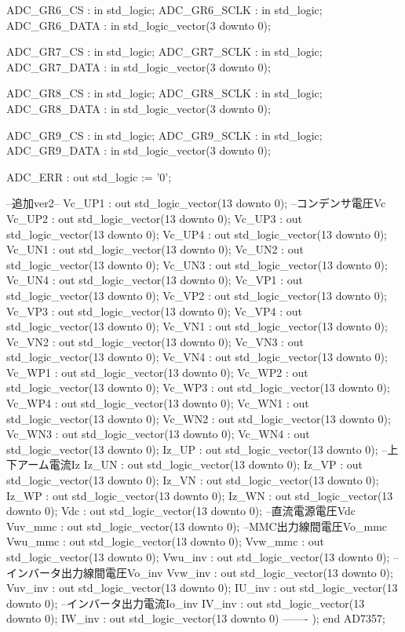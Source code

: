 \begin{mylisting}[language=VHDL,caption=AD変換モジュール,label=appF_ADC_module_VHDL]
		ADC_GR6_CS		: in	std_logic;
		ADC_GR6_SCLK	: in	std_logic;
		ADC_GR6_DATA	: in	std_logic_vector(3 downto 0);

		ADC_GR7_CS		: in	std_logic;
		ADC_GR7_SCLK	: in	std_logic;
		ADC_GR7_DATA	: in	std_logic_vector(3 downto 0);

		ADC_GR8_CS		: in	std_logic;
		ADC_GR8_SCLK	: in	std_logic;
		ADC_GR8_DATA	: in	std_logic_vector(3 downto 0);

		ADC_GR9_CS		: in	std_logic;
		ADC_GR9_SCLK	: in	std_logic;
		ADC_GR9_DATA	: in	std_logic_vector(3 downto 0);
		
		ADC_ERR			: out	std_logic						:= '0';
		
		--追加ver2--
		Vc_UP1		: out	std_logic_vector(13 downto 0);		--コンデンサ電圧Vc
		Vc_UP2		: out	std_logic_vector(13 downto 0);
		Vc_UP3		: out	std_logic_vector(13 downto 0);
		Vc_UP4		: out	std_logic_vector(13 downto 0);
		Vc_UN1		: out	std_logic_vector(13 downto 0);
		Vc_UN2		: out	std_logic_vector(13 downto 0);
		Vc_UN3		: out	std_logic_vector(13 downto 0);
		Vc_UN4		: out	std_logic_vector(13 downto 0);
		Vc_VP1		: out	std_logic_vector(13 downto 0);
		Vc_VP2		: out	std_logic_vector(13 downto 0);
		Vc_VP3		: out	std_logic_vector(13 downto 0);
		Vc_VP4		: out	std_logic_vector(13 downto 0);
		Vc_VN1		: out	std_logic_vector(13 downto 0);
		Vc_VN2		: out	std_logic_vector(13 downto 0);
		Vc_VN3		: out	std_logic_vector(13 downto 0);
		Vc_VN4		: out	std_logic_vector(13 downto 0);
		Vc_WP1		: out	std_logic_vector(13 downto 0);
		Vc_WP2		: out	std_logic_vector(13 downto 0);
		Vc_WP3		: out	std_logic_vector(13 downto 0);
		Vc_WP4		: out	std_logic_vector(13 downto 0);
		Vc_WN1		: out	std_logic_vector(13 downto 0);
		Vc_WN2		: out	std_logic_vector(13 downto 0);
		Vc_WN3		: out	std_logic_vector(13 downto 0);
		Vc_WN4		: out	std_logic_vector(13 downto 0);
		Iz_UP			: out	std_logic_vector(13 downto 0);		--上下アーム電流Iz
		Iz_UN			: out	std_logic_vector(13 downto 0);
		Iz_VP			: out	std_logic_vector(13 downto 0);
		Iz_VN			: out	std_logic_vector(13 downto 0);
		Iz_WP			: out	std_logic_vector(13 downto 0);
		Iz_WN			: out	std_logic_vector(13 downto 0);
		Vdc			: out	std_logic_vector(13 downto 0);			--直流電源電圧Vdc
		Vuv_mmc		: out	std_logic_vector(13 downto 0);		--MMC出力線間電圧Vo_mmc
		Vwu_mmc		: out	std_logic_vector(13 downto 0);
		Vvw_mmc		: out	std_logic_vector(13 downto 0);
		Vwu_inv		: out	std_logic_vector(13 downto 0);		--インバータ出力線間電圧Vo_inv
		Vvw_inv		: out	std_logic_vector(13 downto 0);
		Vuv_inv		: out	std_logic_vector(13 downto 0);
		IU_inv		: out	std_logic_vector(13 downto 0);		--インバータ出力電流Io_inv
		IV_inv		: out	std_logic_vector(13 downto 0);
		IW_inv		: out	std_logic_vector(13 downto 0)
		-------		
		);
end AD7357;


\end{mylisting}
